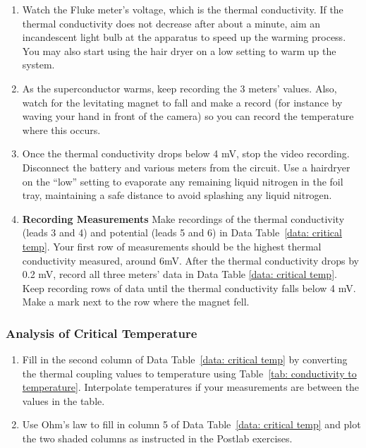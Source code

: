 \documentclass[addpoints]{physlabs}
\begin{document}
\begin{labsection}
\begin{experiment}
\begin{enumerate}
    \item Watch the Fluke meter's voltage, which is the thermal conductivity.
    If the thermal conductivity does not decrease after about a minute, aim an incandescent light bulb at the apparatus to speed up the warming process. 
    You may also start using the hair dryer on a low setting to warm up the system.

    \item  As the superconductor warms, keep recording the 3 meters' values. 
    Also, watch for the levitating magnet to fall and make a record (for instance by waving your hand in front of the camera) so you can record the temperature where this occurs.

    \item Once the thermal conductivity drops below 4 mV, stop the video recording.
    Disconnect the battery and various meters from the circuit. 
    Use a hairdryer on the ``low'' setting to evaporate any remaining liquid nitrogen in the foil tray, maintaining a safe distance to avoid splashing any liquid nitrogen.

    \item \textbf{Recording Measurements} Make recordings of the thermal conductivity (leads 3 and 4) and potential (leads 5 and 6) in Data Table~\ref{data: critical temp}. 
    Your first row of measurements should be the highest thermal conductivity measured, around 6mV.
    After the thermal conductivity drops by 0.2 mV, record all three meters' data in Data Table \ref{data: critical temp}. Keep recording rows of data until the thermal conductivity falls below 4 mV.
    Make a mark next to the row where the magnet fell.
\end{enumerate}

\subsubsection*{Analysis of Critical Temperature}

\begin{enumerate}
    \item Fill in the second column of Data Table~\ref{data: critical temp} by converting the thermal coupling values to temperature using Table~\ref{tab: conductivity to temperature}. Interpolate temperatures if your measurements are between the values in the table.

    \item Use Ohm's law to fill in column 5 of Data Table~\ref{data: critical temp} and plot the two shaded columns as instructed in the Postlab exercises.
\end{enumerate}

\end{experiment}

\end{labsection}
\end{document}

